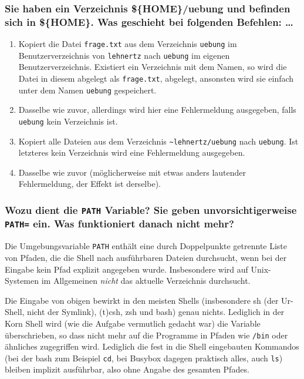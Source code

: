 \subsubsection*{Sie haben ein Verzeichnis \$\{HOME\}/uebung und befinden sich in
\$\{HOME\}.  Was geschieht bei folgenden Befehlen: \dots}
\begin{enumerate}
    \item Kopiert die Datei \verb'frage.txt' aus dem Verzeichnis
        \verb'uebung' im Benutzerverzeichnis von \verb'lehnertz' nach
        \verb'uebung' im eigenen Benutzerverzeichnis. Existiert ein
        Verzeichnis mit dem Namen, so wird die Datei in diesem abgelegt
        als \verb'frage.txt', abgelegt, ansonsten wird sie einfach unter
        dem Namen \verb'uebung' gespeichert.
    \item Dasselbe wie zuvor, allerdings wird hier eine Fehlermeldung
        ausgegeben, falls \verb'uebung' kein Verzeichnis ist.
    \item Kopiert alle Dateien aus dem Verzeichnis
        \verb'~lehnertz/uebung' nach \verb'uebung'. Ist letzteres kein
        Verzeichnis wird eine Fehlermeldung ausgegeben.
    \item Dasselbe wie zuvor (m\"oglicherweise mit etwas anders
        lautender Fehlermeldung, der Effekt ist derselbe).
\end{enumerate}

\subsubsection*{Wozu dient die \lstinline'PATH' Variable? Sie geben
unvorsichtigerweise \lstinline'PATH=' ein. Was funktioniert danach nicht mehr?}
Die Umgebungsvariable \lstinline'PATH' enthält eine durch Doppelpunkte getrennte
Liste von Pfaden, die die Shell nach ausführbaren Dateien durchsucht, wenn bei
der Eingabe kein Pfad explizit angegeben wurde. Insbesondere wird auf
Unix-Systemen im Allgemeinen \emph{nicht} das aktuelle Verzeichnis durchsucht.

Die Eingabe von obigen bewirkt in den meisten Shells (insbesondere sh (der
Ur-Shell, nicht der Symlink), (t)csh, zsh und bash) genau nichts. Lediglich in
der Korn Shell wird (wie die Aufgabe vermutlich gedacht war) die Variable
überschrieben, so dass nicht mehr auf die Programme in Pfaden wie \verb'/bin'
oder ähnliches zugegriffen wird. Lediglich die fest in die Shell eingebauten
Kommandos (bei der bash zum Beispiel \verb'cd', bei Busybox dagegen praktisch
alles, auch \verb'ls') bleiben implizit ausführbar, also ohne Angabe des
gesamten Pfades.


